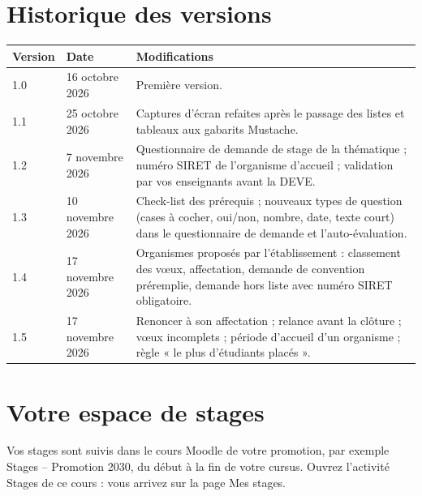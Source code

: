 \documentclass[11pt,a4paper]{article}
\begin{document}

\tableofcontents

\section*{Historique des versions}

\begin{center}
\begin{tabularx}{\linewidth}{@{}l l X@{}}
\toprule
\textbf{Version} & \textbf{Date} & \textbf{Modifications} \\
\midrule
1.0 & 16 octobre 2026 & Première version. \\
1.1 & 25 octobre 2026 & Captures d'écran refaites après le passage des listes et tableaux aux gabarits Mustache. \\
1.2 & 7 novembre 2026 & Questionnaire de demande de stage de la thématique ; numéro SIRET de l'organisme d'accueil ; validation par vos enseignants avant la DEVE. \\
1.3 & 10 novembre 2026 & Check-list des prérequis ; nouveaux types de question (cases à cocher, oui/non, nombre, date, texte court) dans le questionnaire de demande et l'auto-évaluation. \\
1.4 & 17 novembre 2026 & Organismes proposés par l'établissement : classement des vœux, affectation, demande de convention préremplie, demande hors liste avec numéro SIRET obligatoire. \\
1.5 & 17 novembre 2026 & Renoncer à son affectation ; relance avant la clôture ; vœux incomplets ; période d'accueil d'un organisme ; règle « le plus d'étudiants placés ». \\
\bottomrule
\end{tabularx}
\end{center}

\newpage

\section{Votre espace de stages}

Vos stages sont suivis dans le cours Moodle de votre promotion, par exemple
\og Stages -- Promotion 2030\fg{}, du début à la fin de votre cursus. Ouvrez
l'activité \og Stages\fg{} de ce cours : vous arrivez sur la page
\og Mes stages\fg{}.
\end{document}
